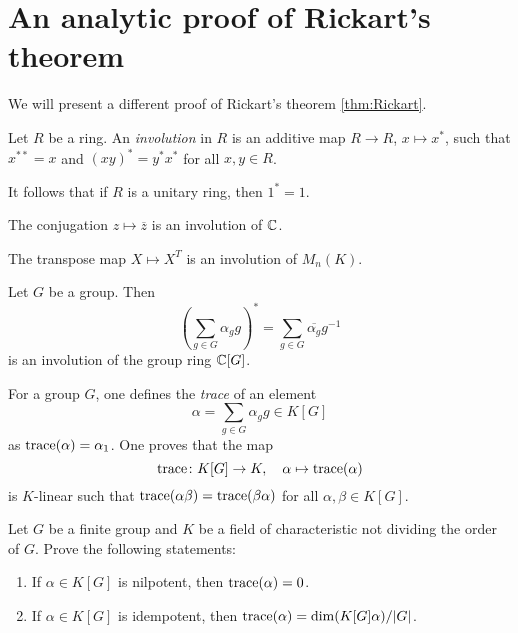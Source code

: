\section{An analytic proof of Rickart's theorem}

We will present a different proof 
of Rickart's theorem \ref{thm:Rickart}. 

\begin{definition}
	Let $R$ be a ring. An \emph{involution} 
    in $R$ is an additive map  
    $R\to R$, $x\mapsto x^*$, such that $x^{**}=x$ and  $(xy)^*=y^*x^*$ for all 
	$x,y\in R$.
\end{definition}

It follows that if $R$ is a unitary ring, then 
$1^*=1$.

\begin{example}
	The conjugation $z\mapsto\overline{z}$ is an 
    involution of $\mathbb{C}$.
\end{example}

\begin{example}
	The transpose map $X\mapsto X^T$ is an involution of $M_n(K)$.
\end{example}

\begin{example}
	Let $G$ be a group. 
    Then \[
    \left(\sum_{g\in G}\alpha_gg\right)^*=\sum_{g\in G}\overline{\alpha_g}g^{-1}
    \]
	is an involution of the group ring $\mathbb{C}[G]$.
\end{example}

For a group $G$, one defines the \emph{trace} 
of an element 
\[
\alpha=\sum_{g\in G}\alpha_gg\in K[G]
\]
as $\operatorname{trace}(\alpha)=\alpha_1$. One proves that 
the map 
\[
\operatorname{trace}\colon K[G]\to K,\quad 
\alpha\mapsto\operatorname{trace}(\alpha)
\]
is $K$-linear such that   
$\operatorname{trace}(\alpha\beta)=\operatorname{trace}(\beta\alpha)$ for 
all $\alpha,\beta\in K[G]$. 

\begin{exercise}
	Let $G$ be a finite group and $K$ 
 be a field of characteristic not dividing the 
 order of $G$.
	Prove the following statements: 
	\begin{enumerate}
		\item If $\alpha\in K[G]$ is nilpotent, then $\operatorname{trace}(\alpha)=0$.
		\item If $\alpha\in K[G]$ is idempotent, then $\operatorname{trace}(\alpha)=\dim
			(K[G]\alpha)/|G|$.
	\end{enumerate}
\end{exercise}

